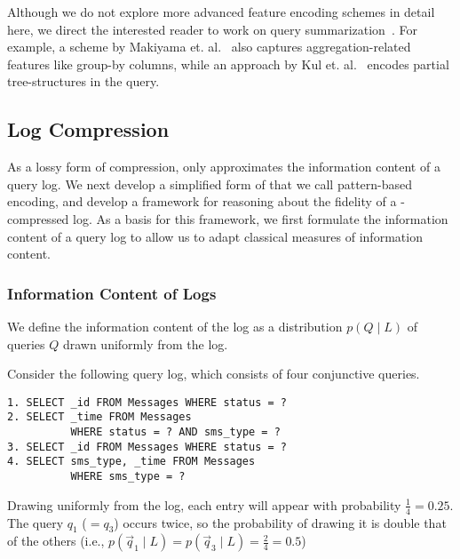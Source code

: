 
Although we do not explore more advanced feature encoding schemes in detail here, we direct the interested reader to work on query summarization~\cite{DBLP:conf/simbig/MakiyamaRS15,DBLP:conf/adbis/AouicheJD06,DBLP:conf/www/KulLXCCKU16}.
For example, a scheme by Makiyama et. al.~\cite{DBLP:conf/simbig/MakiyamaRS15} also captures aggregation-related features like group-by columns, while an approach by Kul et. al.~\cite{DBLP:conf/www/KulLXCCKU16} encodes partial tree-structures in the query. 

\pagebreak

\subsection{Log Compression}
\label{queryrepresentation}

As a lossy form of compression, \systemnameone only approximates the information content of a query log.
We next develop a simplified form of \systemnameone that we call pattern-based encoding, and develop a framework for reasoning about the fidelity of a \systemnameone-compressed log.
As a basis for this framework, we first formulate the information content of a query log to allow us to adapt classical measures of information content.

\subsubsection{Information Content of Logs}
\label{sec:informationcontentoflogs}

We define the information content of the log as a distribution $p(Q\;|\;L)$ of queries $Q$ drawn uniformly from the log.

\begin{example}
\label{distributionExample}
Consider the following query log, which consists of four conjunctive queries.
\begin{lstlisting}
1. SELECT _id FROM Messages WHERE status = ?
2. SELECT _time FROM Messages 
          WHERE status = ? AND sms_type = ?
3. SELECT _id FROM Messages WHERE status = ?
4. SELECT sms_type, _time FROM Messages 
          WHERE sms_type = ?
\end{lstlisting}
Drawing uniformly from the log, each entry will appear with probability $\frac{1}{4} = 0.25$.
The query $q_1$ ($=q_3$) occurs twice, so the probability of drawing it is double that of the others (i.e., $p(\vec{q}_1\;|\;L) = p(\vec{q}_3\;|\;L) = \frac{2}{4} = 0.5$)
\end{example}

